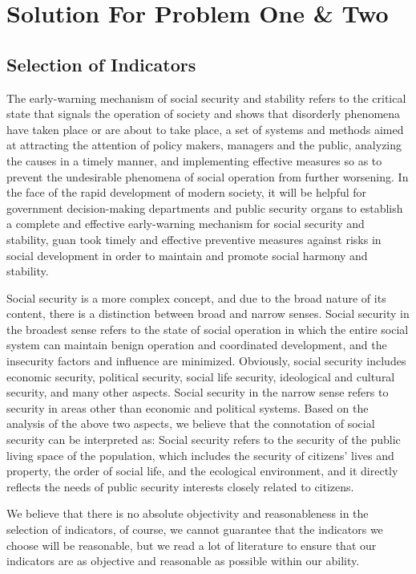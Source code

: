 \documentclass[12pt]{article}  %
\begin{document}
\section{Solution For Problem One \& Two}
\subsection{Selection of Indicators}
The early-warning mechanism of social security and stability refers to the critical state that signals the operation of society and shows that disorderly phenomena have taken place or are about to take place, a set of systems and methods aimed at attracting the attention of policy makers, managers and the public, analyzing the causes in a timely manner, and implementing effective measures so as to prevent the undesirable phenomena of social operation from further worsening. In the face of the rapid development of modern society, it will be helpful for government decision-making departments and public security organs to establish a complete and effective early-warning mechanism for social security and stability, guan took timely and effective preventive measures against risks in social development in order to maintain and promote social harmony and stability.

Social security is a more complex concept, and due to the broad nature of its content, there is a distinction between broad and narrow senses. Social security in the broadest sense refers to the state of social operation in which the entire social system can maintain benign operation and coordinated development, and the insecurity factors and influence are minimized. Obviously, social security includes economic security, political security, social life security, ideological and cultural security, and many other aspects. Social security in the narrow sense refers to security in areas other than economic and political systems. Based on the analysis of the above two aspects, we believe that the connotation of social security can be interpreted as: Social security refers to the security of the public living space of the population, which includes the security of citizens' lives and property, the order of social life, and the ecological environment, and it directly reflects the needs of public security interests closely related to citizens.

We believe that there is no absolute objectivity and reasonableness in the selection of indicators, of course, we cannot guarantee that the indicators we choose will be reasonable, but we read a lot of literature to ensure that our indicators are as objective and reasonable as possible within our ability.
\end{document}
